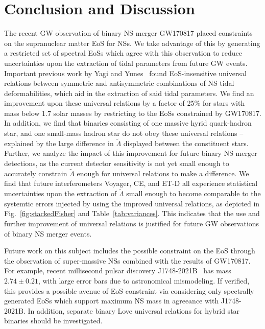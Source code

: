\documentclass[prd,twocolumn,nofootinbib,superscriptaddress,amsmath,amssymb]{revtex4-1}
\begin{document}
\section{Conclusion and Discussion}\label{sec:conclusion}
The recent GW observation of binary NS merger GW170817 placed constraints on the supranuclear matter EoS for NSs.
We take advantage of this by generating a restricted set of spectral EoSs which agree with this observation to reduce uncertainties upon the extraction of tidal parameters from future GW events.
Important previous work by Yagi and Yunes~\cite{Yagi:ILQ,Yagi:binLove} found EoS-insensitive universal relations between symmetric and antisymmetric combinations of NS tidal deformabilities, which aid in the extraction of said tidal parameters.
We find an improvement upon these universal relations by a factor of 25\% for stars with mass below 1.7 solar masses by restricting to the EoSs constrained by GW170817.
In addition, we find that binaries consisting of one massive hyrid quark-hadron star, and one small-mass hadron star do not obey these universal relations -- explained by the large difference in $\tilde{\Lambda}$ displayed between the constituent stars.
Further, we analyze the impact of this improvement for future binary NS merger detections, as the current detector sensitivity is not yet small enough to accurately constrain $\tilde{\Lambda}$ enough for universal relations to make a difference.
We find that future interferometers Voyager, CE, and ET-D all experience statistical uncertainties upon the extraction of $\tilde{\Lambda}$ small enough to become comparable to the systemtic errors injected by using the improved universal relations, as depicted in Fig.~\ref{fig:stackedFisher} and Table~\ref{tab:variances}.
This indicates that the use and further improvement of universal relations is justified for future GW observations of binary NS merger events.

Future work on this subject includes the possible constraint on the EoS through the observation of super-massive NSs combined with the results of GW170817.
For example, recent millisecond pulsar discovery J1748-2021B~\cite{Freire:superMassiveNS} has mass $2.74 \pm 0.21$, with large error bars due to astronomical mismodeling.
If verified, this provides a possible avenue of EoS constraint via considering only spectrally generated EoSs which support maximum NS mass in agreeance with J1748-2021B.
In addition, separate binary Love universal relations for hybrid star binaries should be investigated.
\end{document}
